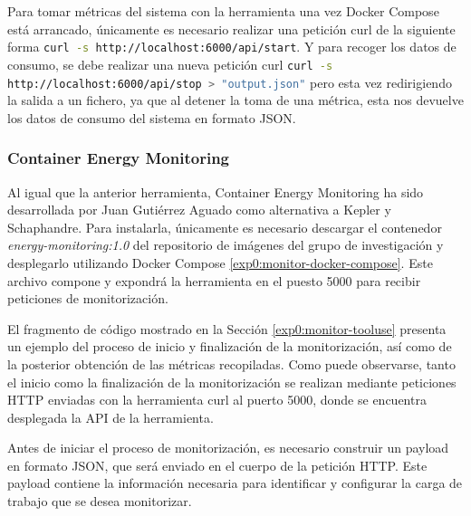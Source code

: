  Para tomar métricas del sistema con la herramienta una vez Docker Compose está arrancado, únicamente es necesario realizar una petición curl de la siguiente forma \lstinline[language=bash]|curl -s http://localhost:6000/api/start|. Y para recoger los datos de consumo, se debe realizar una nueva petición curl \lstinline[language=bash]|curl -s http://localhost:6000/api/stop > "output.json"| pero esta vez redirigiendo la salida a un fichero, ya que al detener la toma de una métrica, esta nos devuelve los datos de consumo del sistema en formato JSON.

 

 

 

 \subsubsection{Container Energy Monitoring}

 Al igual que la anterior herramienta, Container Energy Monitoring ha sido desarrollada por Juan Gutiérrez Aguado como alternativa a Kepler y Schaphandre. Para instalarla, únicamente es necesario descargar el contenedor \textit{energy-monitoring:1.0} del repositorio de imágenes del grupo de investigación y desplegarlo utilizando Docker Compose \ref{exp0:monitor-docker-compose}. Este archivo compone y expondrá la herramienta en el puesto 5000 para recibir peticiones de monitorización.


 El fragmento de código mostrado en la Sección \ref{exp0:monitor-tooluse} presenta un ejemplo del proceso de inicio y finalización de la monitorización, así como de la posterior obtención de las métricas recopiladas. Como puede observarse, tanto el inicio como la finalización de la monitorización se realizan mediante peticiones HTTP enviadas con la herramienta curl al puerto 5000, donde se encuentra desplegada la API de la herramienta.

 

 Antes de iniciar el proceso de monitorización, es necesario construir un payload en formato JSON, que será enviado en el cuerpo de la petición HTTP. Este payload contiene la información necesaria para identificar y configurar la carga de trabajo que se desea monitorizar.

 

